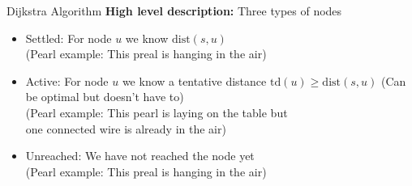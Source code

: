 \begin{frame}{Dijkstra Algorithm}
  \textbf{High level description:}
  Three types of nodes
  \begin{itemize}
    \item
      {\color{Mittel-Blau}Settled:}
      For node {\color{Mittel-Blau}$u$} we know
      {\color{Mittel-Blau}$\mathrm{dist}(s, u)$}
      \hfill
      \\
      {\color{gray}(Pearl example: This preal is hanging in the air)}
      \vspace{0.5em}
    \item
      {\color{Mittel-Blau}Active:}
      For node {\color{Mittel-Blau}$u$} we know a tentative distance
      {\color{Mittel-Blau}$\mathrm{td}(u) \geq \mathrm{dist}(s, u)$}
      (Can be optimal but doesn't have to)
      \hfill
      \\
      {\color{gray}(Pearl example: This pearl is laying on the table but\\
        one connected wire is already in the air)}
        \vspace{0.5em}
    \item
      {\color{Mittel-Blau}Unreached:}
      We have not reached the node yet
      \hfill
      \\
        {\color{gray}(Pearl example: This preal is hanging in the air)}
  \end{itemize}
\end{frame}


